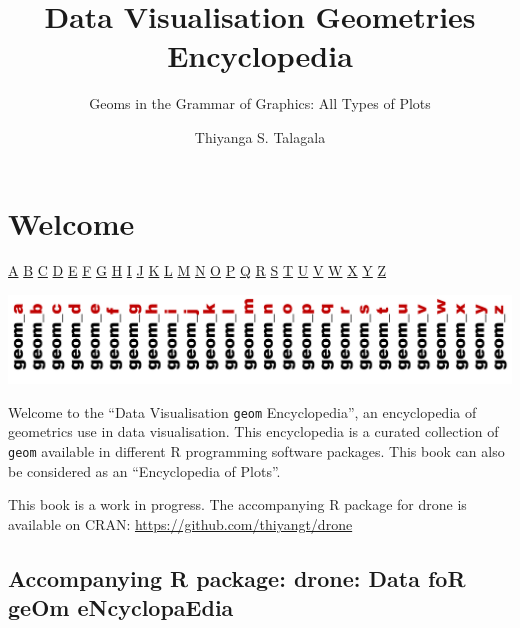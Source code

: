 \documentclass[
  letterpaper,
  DIV=11,
  numbers=noendperiod]{scrreprt}
\title{Data Visualisation {Geom}etries Encyclopedia}
\subtitle{Geoms in the Grammar of Graphics: All Types of Plots}
\author{Thiyanga S. Talagala}
\date{}
\renewcommand*\contentsname{Table of contents}
\newcommand\contentsname{Table of contents}
\begin{document}
\maketitle

\renewcommand*\contentsname{Table of contents}
{
\hypersetup{linkcolor=}
\setcounter{tocdepth}{2}
\tableofcontents
}


\chapter*{Welcome}\label{welcome}


\hyperref[sec-a]{A} \textbar{} \hyperref[sec-b]{B} \textbar{}
\hyperref[sec-c]{C} \textbar{} \hyperref[sec-d]{D} \textbar{}
\hyperref[sec-e]{E} \textbar{} \hyperref[sec-f]{F} \textbar{}
\hyperref[sec-g]{G} \textbar{} \hyperref[sec-h]{H} \textbar{}
\hyperref[sec-i]{I} \textbar{} \hyperref[sec-j]{J} \textbar{}
\hyperref[sec-k]{K} \textbar{} \hyperref[sec-l]{L} \textbar{}
\hyperref[sec-m]{M} \textbar{} \hyperref[sec-n]{N} \textbar{}
\hyperref[sec-o]{O} \textbar{} \hyperref[sec-p]{P} \textbar{}
\hyperref[sec-q]{Q} \textbar{} \hyperref[sec-r]{R} \textbar{}
\hyperref[sec-s]{S} \textbar{} \hyperref[sec-t]{T} \textbar{}
\hyperref[sec-u]{U} \textbar{} \hyperref[sec-v]{V} \textbar{}
\hyperref[sec-w]{W} \textbar{} \hyperref[sec-x]{X} \textbar{}
\hyperref[sec-y]{Y} \textbar{} \hyperref[sec-z]{Z} \textbar{}

\includegraphics{cover/cover.labels.png}

Welcome to the ``Data Visualisation \texttt{geom} Encyclopedia'', an
encyclopedia of geometrics use in data visualisation. This encyclopedia
is a curated collection of \texttt{geom} available in different R
programming software packages. This book can also be considered as an
``Encyclopedia of Plots''.

This book is a work in progress. The accompanying R package for drone is
available on CRAN: \url{https://github.com/thiyangt/drone}

\section*{\texorpdfstring{Accompanying R package: {drone}: {D}ata fo{R}
ge{O}m
e{N}cyclopa{E}dia}{Accompanying R package: drone: Data foR geOm eNcyclopaEdia}}\label{accompanying-r-package-drone-data-for-geom-encyclopaedia}
\end{document}
